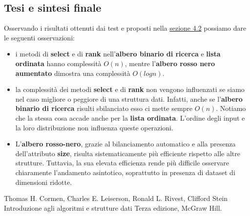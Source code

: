 \documentclass[10pt]{article}
\begin{document}
\newpage
\subsection{Tesi e sintesi finale}
Osservando i risultati ottenuti dai test e proposti nella  \hyperref[risultati sperimentali]{sezione 4.2} possiamo dare le seguenti osservazioni:
\begin{itemize}
    \item i metodi di \textbf{select} e di \textbf{rank} nell'\textbf{albero binario di ricerca} e \textbf{lista ordinata} hanno complessità $O(n)$, mentre l'\textbf{albero rosso nero aumentato} dimostra una complessità $O(logn)$.
    \item la complessità dei metodi \textbf{select} e di \textbf{rank} non vengono influenzati se siamo nel caso migliore o peggiore di una struttura dati. Infatti, anche se l'\textbf{albero binario di ricerca} risulti sbilanciato esso ci mette sempre $O(n)$. Notiamo che la stessa cosa accade anche per la \textbf{lista ordinata}.
    L'ordine degli input e la loro distribuzione non influenza queste operazioni.
    \item L'\textbf{albero rosso-nero}, grazie al bilanciamento automatico e alla presenza dell'attributo \textbf{size}, risulta sistematicamente più efficiente rispetto alle altre strutture. Tuttavia, la sua elevata efficienza rende più difficile osservare chiaramente l'andamento asintotico, soprattutto in presenza di dataset di dimensioni ridotte.
\end{itemize}
\newpage
\begin{thebibliography}{9}
\bibitem{}
Thomas H. Cormen, Charles E. Leiserson, Ronald L. Rivest, Clifford Stein Introduzione agli algoritmi e strutture dati Terza edizione, McGraw Hill.

\end{thebibliography}   
\end{document}
